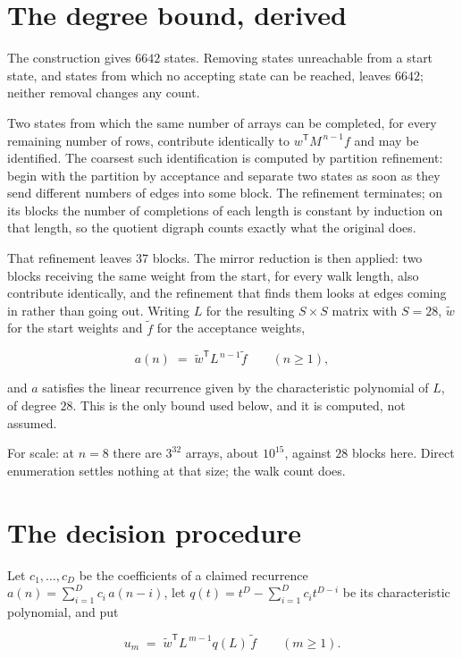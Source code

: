\documentclass[11pt]{article}
\theoremstyle{definition}
\begin{document}
\section{The degree bound, derived}

The construction gives $6642$ states. Removing states unreachable from a start state, and states from which no accepting state can be reached, leaves $6642$; neither removal changes any count.

Two states from which the same number of arrays can be completed, for every remaining number of rows, contribute identically to $w^{\mathsf T}M^{\,n-1}f$ and may be identified. The coarsest such identification is computed by partition refinement: begin with the partition by acceptance and separate two states as soon as they send different numbers of edges into some block. The refinement terminates; on its blocks the number of completions of each length is constant by induction on that length, so the quotient digraph counts exactly what the original does.

That refinement leaves $37$ blocks. The mirror reduction is then applied: two blocks receiving the same weight from the start, for every walk length, also contribute identically, and the refinement that finds them looks at edges coming in rather than going out. Writing $L$ for the resulting $S \times S$ matrix with $S = 28$, $\tilde w$ for the start weights and $\tilde f$ for the acceptance weights,

\[a(n) \;=\; \tilde w^{\mathsf T} L^{\,n-1} \tilde f \qquad (n \ge 1),\]

and $a$ satisfies the linear recurrence given by the characteristic polynomial of $L$, of degree $28$. This is the only bound used below, and it is computed, not assumed.

For scale: at $n = 8$ there are $3^{32}$ arrays, about $10^{15}$, against $28$ blocks here. Direct enumeration settles nothing at that size; the walk count does.

\section{The decision procedure}

Let $c_1,\dots,c_D$ be the coefficients of a claimed recurrence $a(n) = \sum_{i=1}^{D} c_i\,a(n-i)$, let $q(t) = t^{D} - \sum_{i=1}^{D} c_i t^{D-i}$ be its characteristic polynomial, and put

\[u_m \;=\; \tilde w^{\mathsf T} L^{\,m-1} q(L)\,\tilde f \qquad (m \ge 1).\]
\end{document}
